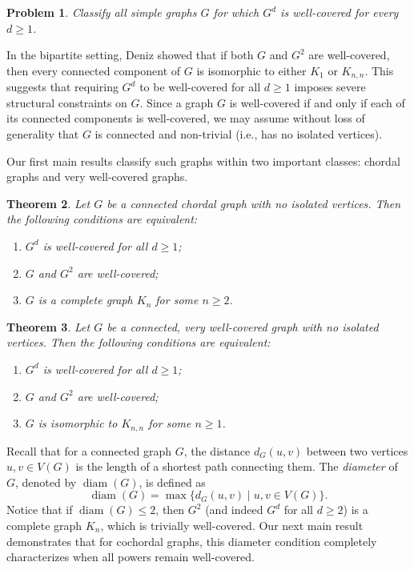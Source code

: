 \documentclass[12pt]{amsart}
\numberwithin{equation}{section}
\newtheorem{thm}{\bf Theorem}[section]
\newtheorem{prob}[thm]{\bf Problem}
\theoremstyle{definition}
\begin{document}
\begin{prob}
Classify all simple graphs $G$ for which $G^d$ is well-covered for every $d \ge 1$.
\end{prob}

In the bipartite setting, Deniz \cite{D} showed that if both $G$ and $G^2$ are well-covered, then every connected component of $G$ is isomorphic to either $K_1$ or $K_{n,n}$. This suggests that requiring $G^d$ to be well-covered for all $d \ge 1$ imposes severe structural constraints on $G$. Since a graph $G$ is well-covered if and only if each of its connected components is well-covered, we may assume without loss of generality that $G$ is connected and non-trivial (i.e., has no isolated vertices). 

Our first main results classify such graphs within two important classes: chordal graphs and very well-covered graphs.

\begin{thm}\label{thm_chordal}
Let $G$ be a connected chordal graph with no isolated vertices. Then the following conditions are equivalent:
\begin{enumerate}
    \item $G^d$ is well-covered for all $d \ge 1$;
    \item $G$ and $G^2$ are well-covered;
    \item $G$ is a complete graph $K_n$ for some $n \ge 2$.
\end{enumerate}
\end{thm}

\begin{thm}\label{thm_very_well}
Let $G$ be a connected, very well-covered graph with no isolated vertices. Then the following conditions are equivalent:
\begin{enumerate}
    \item $G^d$ is well-covered for all $d \ge 1$;
    \item $G$ and $G^2$ are well-covered;
    \item $G$ is isomorphic to $K_{n,n}$ for some $n \ge 1$.
\end{enumerate}
\end{thm}

Recall that for a connected graph $G$, the distance $d_G(u, v)$ between two vertices $u, v \in V(G)$ is the length of a shortest path connecting them. The \emph{diameter} of $G$, denoted by $\operatorname{diam}(G)$, is defined as
\[
\operatorname{diam}(G) = \max \{ d_G(u, v) \mid u, v \in V(G) \}.
\]
Notice that if $\operatorname{diam}(G) \le 2$, then $G^2$ (and indeed $G^d$ for all $d \ge 2$) is a complete graph $K_n$, which is trivially well-covered. Our next main result demonstrates that for cochordal graphs, this diameter condition completely characterizes when all powers remain well-covered.
\end{document}
